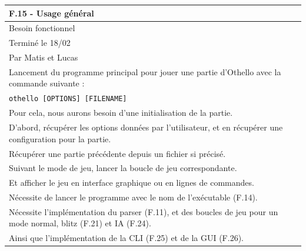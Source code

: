 \documentclass[a4paper,12pt]{article}
\begin{document}
\noindent
\setlength{\arrayrulewidth}{1.5pt}
\renewcommand{\arraystretch}{1.5}
\begin{tabularx}{\textwidth}{|X|}
    \hline
    \textbf{F.15 - Usage général}                                                                                      \\
    \hline
    Besoin fonctionnel                                                                                                 \\
    \hline
    Terminé le 18/02                                                                                                   \\
    Par Matis et Lucas                                                                                                 \\
    \hline
    Lancement du programme principal pour jouer une partie d’Othello avec la commande suivante :                       \\
    \texttt{othello [OPTIONS] [FILENAME]}                                                                              \\
    Pour cela, nous aurons besoin d’une initialisation de la partie.                                                   \\
    D’abord, récupérer les options données par l’utilisateur, et en récupérer une configuration pour la partie.        \\
    Récupérer une partie précédente depuis un fichier si précisé.                                                      \\
    Suivant le mode de jeu, lancer la boucle de jeu correspondante.                                                    \\
    Et afficher le jeu en interface graphique ou en lignes de commandes.                                               \\
    \hline
    Nécessite de lancer le programme avec le nom de l’exécutable (F.14).                                               \\
    Nécessite l’implémentation du parser (F.11), et des boucles de jeu pour un mode normal, blitz (F.21) et IA (F.24). \\
    Ainsi que l’implémentation de la CLI (F.25) et de la GUI (F.26).                                                   \\
    \hline
\end{tabularx}
\end{document}
